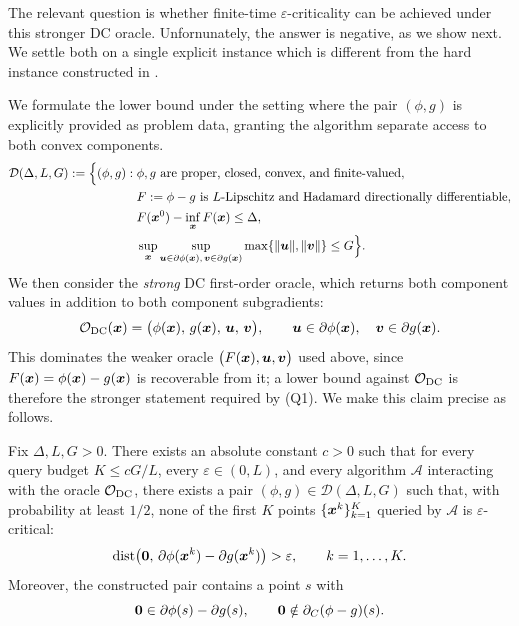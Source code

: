 The relevant question is whether finite-time $\varepsilon$-criticality can be achieved under this stronger DC oracle. Unfornunately, the answer is negative, as we show next. 
We settle both on a single explicit instance which is different from the hard instance constructed in \cite{Zhang-2020-Complexity}.

We formulate the lower bound under the setting where the pair $(\phi,g)$ is explicitly provided as problem data, granting the algorithm separate access to both convex components. 
\[
\begin{aligned}
\mathcal D(\Delta,L,G) := \Bigl\{ (\phi,g):\;& \phi,g \text{ are proper, closed, convex, and finite-valued},\\
& F:=\phi-g \text{ is } L\text{-Lipschitz and Hadamard directionally differentiable},\\
& F(\bm{x}^0)-\inf\limits_{\bm{x}}F(\bm{x})\le \Delta,\\
& \sup\limits_{\bm{x}} \sup\limits_{\bm{u}\in\partial\phi(\bm{x}),\,\bm{v}\in\partial g(\bm{x})} \max\limits\{\|\bm{u}\|,\|\bm{v}\|\} \le G \Bigr\}.
\end{aligned}
\]
We then consider the \emph{strong} DC first-order oracle, which returns
both component values in addition to both component subgradients:
\[
    \mathcal O_{\rm DC}(\bm{x}) = \bigl( \phi(\bm{x}),\,g(\bm{x}),\,\bm{u},\,\bm{v} \bigr), \qquad \bm{u}\in\partial\phi(\bm{x}),\quad \bm{v}\in\partial g(\bm{x}).
\]
This dominates the weaker oracle $\bigl(F(\bm{x}),\bm{u},\bm{v}\bigr)$ used above, since $F(\bm{x})=\phi(\bm{x})-g(\bm{x})$ is recoverable from it; a lower bound against $\mathcal O_{\rm DC}$ is therefore the stronger statement required by (Q1). We make this claim precise as follows.
\begin{theorem}
\label{thm:dc-oracle-limitation-sketch}
Fix $\Delta,L,G>0$. There exists an absolute constant $c>0$ such that for every query budget $K\le cG/L$, every $\varepsilon\in(0,L)$, and every algorithm $\mathcal{A}$ interacting with the oracle $\mathcal O_{\rm DC}$, there exists a pair $(\phi,g)\in\mathcal D(\Delta,L,G)$ such that, with probability at least $1/2$, none of the first $K$ points $\{\bm{x}^k\}_{k=1}^K$ queried by $\mathcal{A}$ is $\varepsilon$-critical:
\[
    \operatorname{dist}\!\left(
        \bm{0},\,
        \partial\phi(\bm{x}^k)-\partial g(\bm{x}^k)
    \right)
    >
    \varepsilon,
    \qquad k=1,\ldots,K.
\]
Moreover, the constructed pair contains a point $s$ with
\[
    \bm{0}\in\partial\phi(s)-\partial g(s),
    \qquad
    \bm{0}\notin\partial_C(\phi-g)(s).
\]
\end{theorem}

